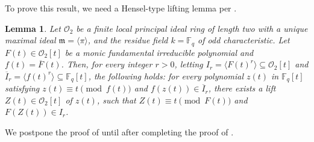 \documentclass[11pt,twoside]{amsart}
\newcommand{\R}{\mathscr{O}_2}
\newtheorem{lemma}{Lemma}[section]
\theoremstyle{definition} %
\begin{document}
To prove this result, we need a Hensel-type lifting lemma per .
\begin{lemma}\label{lem-Hensel-type-5}
Let $\R$ be a finite local principal ideal ring of length two with a unique maximal ideal $\mathfrak{m}=\langle\pi\rangle$, and the residue field $k=\mathbb F_q$ of odd characteristic.
Let $F(t)\in\R[t]$ be a monic fundamental irreducible polynomial and $f(t)=\overline{F}(t)$.
Then, for every integer $r > 0$, letting $I_r = \langle F(t)^r \rangle \subseteq \R[t]$ and $\overline{I}_r = \langle f(t)^r \rangle \subseteq \mathbb{F}_q[t]$, the following holds: for every polynomial $z(t)$ in $\mathbb{F}_q[t]$ satisfying $z(t)\equiv t\pmod{f(t)}$ and $f(z(t))\in \overline{I}_r$, there exists a lift $Z(t)\in \mathscr{O}_2[t]$ of $z(t)$, such that $Z(t)\equiv t\pmod{F(t)}$ and $F(Z(t))\in I_r$.
\end{lemma}
We postpone the proof of  until after completing the proof of .
\end{document}

